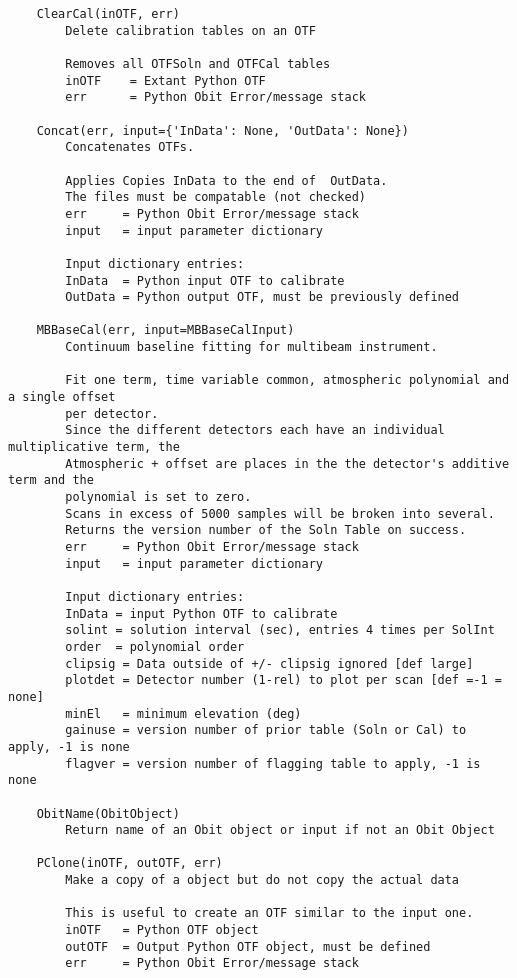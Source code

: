 \documentclass[11pt]{report}
\begin{document}
\begin{verbatim}
    ClearCal(inOTF, err)
        Delete calibration tables on an OTF
        
        Removes all OTFSoln and OTFCal tables
        inOTF    = Extant Python OTF
        err      = Python Obit Error/message stack
    
    Concat(err, input={'InData': None, 'OutData': None})
        Concatenates OTFs.
        
        Applies Copies InData to the end of  OutData.
        The files must be compatable (not checked)
        err     = Python Obit Error/message stack
        input   = input parameter dictionary
        
        Input dictionary entries:
        InData  = Python input OTF to calibrate
        OutData = Python output OTF, must be previously defined
    
    MBBaseCal(err, input=MBBaseCalInput)
        Continuum baseline fitting for multibeam instrument.
        
        Fit one term, time variable common, atmospheric polynomial and a single offset
        per detector.
        Since the different detectors each have an individual multiplicative term, the 
        Atmospheric + offset are places in the the detector's additive term and the
        polynomial is set to zero.
        Scans in excess of 5000 samples will be broken into several.
        Returns the version number of the Soln Table on success.
        err     = Python Obit Error/message stack
        input   = input parameter dictionary
        
        Input dictionary entries:
        InData = input Python OTF to calibrate
        solint = solution interval (sec), entries 4 times per SolInt
        order  = polynomial order
        clipsig = Data outside of +/- clipsig ignored [def large]
        plotdet = Detector number (1-rel) to plot per scan [def =-1 = none]
        minEl   = minimum elevation (deg)
        gainuse = version number of prior table (Soln or Cal) to apply, -1 is none
        flagver = version number of flagging table to apply, -1 is none
    
    ObitName(ObitObject)
        Return name of an Obit object or input if not an Obit Object
    
    PClone(inOTF, outOTF, err)
        Make a copy of a object but do not copy the actual data
        
        This is useful to create an OTF similar to the input one.
        inOTF   = Python OTF object
        outOTF  = Output Python OTF object, must be defined
        err     = Python Obit Error/message stack
    

\end{verbatim}
\end{document}
